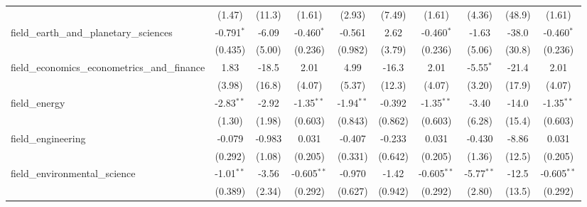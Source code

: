 \begin{tabular}{lccccccccc}
                                                               & (1.47)         & (11.3)        & (1.61)         & (2.93)         & (7.49)       & (1.61)         & (4.36)         & (48.9)        & (1.61)\\   
   field\_earth\_and\_planetary\_sciences                      & -0.791$^{*}$   & -6.09         & -0.460$^{*}$   & -0.561         & 2.62         & -0.460$^{*}$   & -1.63          & -38.0         & -0.460$^{*}$\\   
                                                               & (0.435)        & (5.00)        & (0.236)        & (0.982)        & (3.79)       & (0.236)        & (5.06)         & (30.8)        & (0.236)\\   
   field\_economics\_econometrics\_and\_finance                & 1.83           & -18.5         & 2.01           & 4.99           & -16.3        & 2.01           & -5.55$^{*}$    & -21.4         & 2.01\\   
                                                               & (3.98)         & (16.8)        & (4.07)         & (5.37)         & (12.3)       & (4.07)         & (3.20)         & (17.9)        & (4.07)\\   
   field\_energy                                               & -2.83$^{**}$   & -2.92         & -1.35$^{**}$   & -1.94$^{**}$   & -0.392       & -1.35$^{**}$   & -3.40          & -14.0         & -1.35$^{**}$\\   
                                                               & (1.30)         & (1.98)        & (0.603)        & (0.843)        & (0.862)      & (0.603)        & (6.28)         & (15.4)        & (0.603)\\   
   field\_engineering                                          & -0.079         & -0.983        & 0.031          & -0.407         & -0.233       & 0.031          & -0.430         & -8.86         & 0.031\\   
                                                               & (0.292)        & (1.08)        & (0.205)        & (0.331)        & (0.642)      & (0.205)        & (1.36)         & (12.5)        & (0.205)\\   
   field\_environmental\_science                               & -1.01$^{**}$   & -3.56         & -0.605$^{**}$  & -0.970         & -1.42        & -0.605$^{**}$  & -5.77$^{**}$   & -12.5         & -0.605$^{**}$\\   
                                                               & (0.389)        & (2.34)        & (0.292)        & (0.627)        & (0.942)      & (0.292)        & (2.80)         & (13.5)        & (0.292)\\   

\end{tabular}
